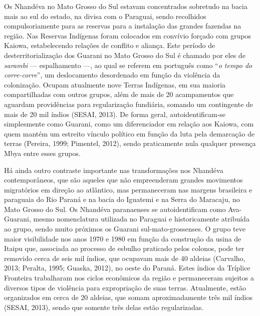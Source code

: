 Os Nhandéva no Mato Grosso do Sul estavam concentrados sobretudo na
bacia mais ao sul do estado, na divisa com o Paraguai, sendo recolhidos
compulsoriamente para as reservas para a instalação das grandes fazendas
na região. Nas Reservas Indígenas foram colocados em convívio forçado
com grupos Kaiowa, estabelecendo relações de conflito e aliança. Este
período de desterritorialização dos Guarani no Mato Grosso do Sul é
chamado por eles de \emph{sarambi} --- espalhamento ---, ao qual se
referem em português como ``\emph{o tempo do corre-corre}'', um
deslocamento desordenado em função da violência da colonização. Ocupam
atualmente nove Terras Indígenas, em sua maioria compartilhadas com
outros grupos, além de mais de 20 acampamentos que aguardam providências
para regularização fundiária, somando um contingente de mais de 20 mil
índios (SESAI, 2013). De forma geral, autoidentificam-se simplesmente
como Guarani, como um diferenciador em relação aos Kaiowa, com quem
mantém um estreito vínculo político em função da luta pela demarcação de
terras (Pereira, 1999; Pimentel, 2012), sendo praticamente nula qualquer
presença Mbya entre esses grupos.

Há ainda outro contraste importante nas transformações nos Nhandéva
contemporâneos, que são aqueles que não empreenderam grandes movimentos
migratórios em direção ao atlântico, mas permaneceram nas margens
brasileira e paraguaia do Rio Paraná e na bacia do Iguatemi e na Serra
do Maracaju, no Mato Grosso do Sul. Os Nhandéva paranaenses se
autoidentificam como Ava-Guarani, mesmo nomenclatura utilizada no
Paraguai e historicamente atribuída ao grupo, sendo muito próximos os
Guarani sul-mato-grossenses. O grupo teve maior visibilidade nos anos
1970 e 1980 em função da construção da usina de Itaipu que, associada ao
processo de esbulho praticado pelos colonos, pode ter removido cerca de
seis mil índios, que ocupavam mais de 40 aldeias (Carvalho, 2013;
Peralta, 1995; Guaska, 2012), no oeste do Paraná. Estes índios da
Tríplice Fronteira trabalharam nos ciclos econômicos da região e
permaneceram sujeitos a diversos tipos de violência para expropriação de
suas terras. Atualmente, estão organizados em cerca de 20 aldeias, que
somam aproximadamente três mil índios (SESAI, 2013), sendo que somente
três delas estão regularizadas.

